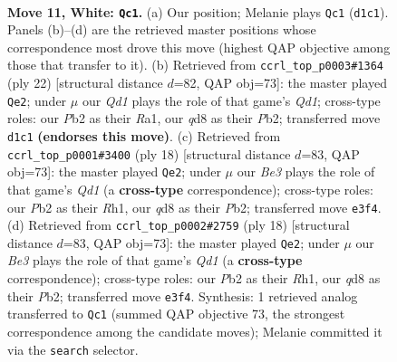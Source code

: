\documentclass[11pt]{article}
\begin{document}
\clearpage

\begin{figure}[p]\centering
\begin{subfigure}{0.46\textwidth}\centering
\resizebox{\linewidth}{!}{%
\newchessgame
\chessboard[
  setfen={rn1qkb1r/5p2/b2p1np1/2pPp3/4P1p1/2N1B3/PP1K1P1P/R2Q1BNR w kq - 0 11},
  showmover=false,
  pgfstyle=straightmove, color=movearrow, markmove={d1-c1}
]}
\caption{}
\end{subfigure}\hfill
\begin{subfigure}{0.46\textwidth}\centering
\resizebox{\linewidth}{!}{%
\newchessgame
\chessboard[
  setfen={rn1qkb1r/5pp1/p1p1pnp1/1p6/3P4/2NBPP2/PP1B2PP/R2QK2R w KQkq - 0 12},
  showmover=false,
  pgfstyle=straightmove, color=movearrow, markmove={d1-e2}
]}
\caption{}
\end{subfigure}
\\[4pt]
\begin{subfigure}{0.46\textwidth}\centering
\resizebox{\linewidth}{!}{%
\newchessgame
\chessboard[
  setfen={rn1qkb1r/pp3ppb/2p1pn1p/4N3/2BP3P/6N1/PPP2PP1/R1BQK2R w KQkq - 0 10},
  showmover=false,
  pgfstyle=straightmove, color=movearrow, markmove={d1-e2}
]}
\caption{}
\end{subfigure}\hfill
\begin{subfigure}{0.46\textwidth}\centering
\resizebox{\linewidth}{!}{%
\newchessgame
\chessboard[
  setfen={rn1qkb1r/pp3ppb/2p1pn1p/4N3/2BP3P/6N1/PPP2PP1/R1BQK2R w KQkq - 0 10},
  showmover=false,
  pgfstyle=straightmove, color=movearrow, markmove={d1-e2}
]}
\caption{}
\end{subfigure}
\caption{\textbf{Move 11, White: \texttt{Qc1}.} (a) Our position; Melanie plays \texttt{Qc1} (\texttt{d1c1}). Panels (b)--(d) are the retrieved master positions whose correspondence most drove this move (highest QAP objective among those that transfer to it). (b) Retrieved from \texttt{ccrl\_top\_p0003\#1364} (ply 22) [structural distance $d$=82, QAP obj=73]: the master played \texttt{Qe2}; under $\mu$ our \emph{Qd1} plays the role of that game's \emph{Qd1}; cross-type roles: our \emph{P}b2 as their \emph{R}a1, our \emph{q}d8 as their \emph{P}b2; transferred move \texttt{d1c1} \textbf{(endorses this move)}. (c) Retrieved from \texttt{ccrl\_top\_p0001\#3400} (ply 18) [structural distance $d$=83, QAP obj=73]: the master played \texttt{Qe2}; under $\mu$ our \emph{Be3} plays the role of that game's \emph{Qd1} (a \textbf{cross-type} correspondence); cross-type roles: our \emph{P}b2 as their \emph{R}h1, our \emph{q}d8 as their \emph{P}b2; transferred move \texttt{e3f4}. (d) Retrieved from \texttt{ccrl\_top\_p0002\#2759} (ply 18) [structural distance $d$=83, QAP obj=73]: the master played \texttt{Qe2}; under $\mu$ our \emph{Be3} plays the role of that game's \emph{Qd1} (a \textbf{cross-type} correspondence); cross-type roles: our \emph{P}b2 as their \emph{R}h1, our \emph{q}d8 as their \emph{P}b2; transferred move \texttt{e3f4}. Synthesis: 1 retrieved analog transferred to \texttt{Qc1} (summed QAP objective 73, the strongest correspondence among the candidate moves); Melanie committed it via the \texttt{search} selector.}
\label{fig:thought-m20}
\end{figure}
\end{document}
